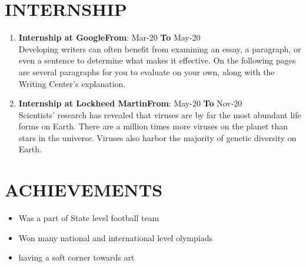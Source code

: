 \documentclass{article}
\begin{document}
\vspace{3pt}
\section*{\large{\uppercase{Internship}}}

\vspace{3pt}
\begin{enumerate}
	\item {\textbf{Internship at Google}}\hfill {\textbf{From}}: Mar-20 {\textbf{To}} May-20\\
	Developing writers can often benefit from examining an essay, a paragraph, or even a sentence to determine what makes it effective. On the following pages are several paragraphs for you to evaluate on your own, along with the Writing Center's explanation.
	\item {\textbf{Internship at Lockheed Martin}}\hfill {\textbf{From}}: May-20 {\textbf{To}} Nov-20\\
	 Scientists' research has revealed that viruses are by far the most abundant life forms on Earth. There are a million times more viruses on the planet than stars in the universe. Viruses also harbor the majority of genetic diversity on Earth.
\end{enumerate}

\vspace{3pt}


\section*{\large{\uppercase{achievements}}}

\vspace{3pt}
\begin{itemize}[noitemsep,nolistsep]
	\item Was a part of State level football team
	\item Won many national and international level olympiads
	\item having a soft corner towards art
\end{itemize}

\vspace{3pt}
\end{document}
